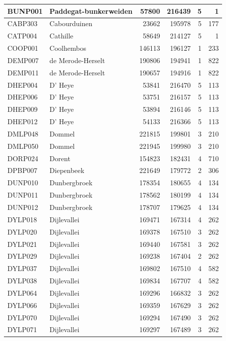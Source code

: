 \documentclass[11pt,]{book}
\begin{document}
\begin{table}
\begin{tabular}[t]{l|l|r|r|r|r}
\hline
BUNP001 & Paddegat-bunkerweiden & 57800 & 216439 & 5 & 1\\
\hline
CABP303 & Cabourduinen & 23662 & 195978 & 5 & 177\\
\hline
CATP004 & Cathille & 58649 & 214127 & 5 & 1\\
\hline
COOP001 & Coolhembos & 146113 & 196127 & 1 & 233\\
\hline
DEMP007 & de Merode-Herselt & 190806 & 194941 & 1 & 822\\
\hline
DEMP011 & de Merode-Herselt & 190657 & 194916 & 1 & 822\\
\hline
DHEP004 & D' Heye & 53841 & 216470 & 5 & 113\\
\hline
DHEP006 & D' Heye & 53751 & 216157 & 5 & 113\\
\hline
DHEP009 & D' Heye & 53894 & 216146 & 5 & 113\\
\hline
DHEP012 & D' Heye & 54133 & 216366 & 5 & 113\\
\hline
DMLP048 & Dommel & 221815 & 199801 & 3 & 210\\
\hline
DMLP050 & Dommel & 221945 & 199980 & 3 & 210\\
\hline
DORP024 & Dorent & 154823 & 182431 & 4 & 710\\
\hline
DPBP007 & Diepenbeek & 221649 & 179772 & 2 & 306\\
\hline
DUNP010 & Dunbergbroek & 178354 & 180655 & 4 & 134\\
\hline
DUNP011 & Dunbergbroek & 178562 & 180199 & 4 & 134\\
\hline
DUNP012 & Dunbergbroek & 178707 & 179625 & 4 & 134\\
\hline
DYLP018 & Dijlevallei & 169471 & 167314 & 4 & 262\\
\hline
DYLP020 & Dijlevallei & 169378 & 167510 & 3 & 262\\
\hline
DYLP021 & Dijlevallei & 169440 & 167581 & 3 & 262\\
\hline
DYLP029 & Dijlevallei & 169238 & 167404 & 2 & 262\\
\hline
DYLP037 & Dijlevallei & 169802 & 167510 & 4 & 582\\
\hline
DYLP038 & Dijlevallei & 169834 & 167707 & 4 & 582\\
\hline
DYLP064 & Dijlevallei & 169296 & 166832 & 3 & 262\\
\hline
DYLP066 & Dijlevallei & 169359 & 167629 & 3 & 262\\
\hline
DYLP070 & Dijlevallei & 169294 & 167490 & 3 & 262\\
\hline
DYLP071 & Dijlevallei & 169297 & 167489 & 3 & 262\\

\end{tabular}
\end{table}
\end{document}
